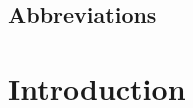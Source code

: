 \conditionalClearPage






\conditionalClearPage
\vspace{15cm}






\conditionalClearPage



\conditionalClearPage




\conditionalClearPage

\begin{changemargin}{0.8cm}{0.8cm}

~\vfill{}

\section*{Abbreviations}



\vskip 2.5cm

\end{changemargin}

\conditionalClearPage


\tableofcontents

\conditionalClearPage

\pagestyle{full}


\chapter{Introduction}


